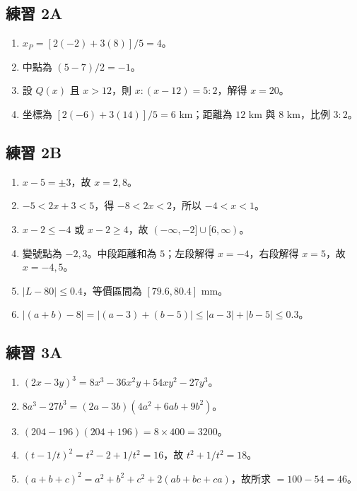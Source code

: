 \documentclass[11pt,a4paper]{article}
\providecommand{\tightlist}{%
  \setlength{\itemsep}{0pt}\setlength{\parskip}{0pt}}
\begin{document}
\subsection{練習 2A}\label{ux7df4ux7fd2-2a-1}

\begin{enumerate}
\def\labelenumi{\arabic{enumi}.}
\tightlist
\item
  \(x_P=[2(-2)+3(8)]/5=\boxed4\)。
\item
  中點為 \((5-7)/2=\boxed{-1}\)。
\item
  設 \(Q(x)\) 且 \(x>12\)，則 \(x:(x-12)=5:2\)，解得 \(x=\boxed{20}\)。
\item
  坐標為 \([2(-6)+3(14)]/5=\boxed6\) km；距離為 \(12\) km 與 \(8\) km，比例 \(3:2\)。
\end{enumerate}

\subsection{練習 2B}\label{ux7df4ux7fd2-2b-1}

\begin{enumerate}
\def\labelenumi{\arabic{enumi}.}
\tightlist
\item
  \(x-5=\pm3\)，故 \(\boxed{x=2,8}\)。
\item
  \(-5<2x+3<5\)，得 \(-8<2x<2\)，所以 \(\boxed{-4<x<1}\)。
\item
  \(x-2\le-4\) 或 \(x-2\ge4\)，故 \(\boxed{(-\infty,-2]\cup[6,\infty)}\)。
\item
  變號點為 \(-2,3\)。中段距離和為 \(5\)；左段解得 \(x=-4\)，右段解得 \(x=5\)，故 \(\boxed{x=-4,5}\)。
\item
  \(\boxed{|L-80|\le0.4}\)，等價區間為 \(\boxed{[79.6,80.4]}\) mm。
\item
  \(|(a+b)-8|=|(a-3)+(b-5)|\le|a-3|+|b-5|\le\boxed{0.3}\)。
\end{enumerate}

\subsection{練習 3A}\label{ux7df4ux7fd2-3a-1}

\begin{enumerate}
\def\labelenumi{\arabic{enumi}.}
\tightlist
\item
  \((2x-3y)^3=\boxed{8x^3-36x^2y+54xy^2-27y^3}\)。
\item
  \(8a^3-27b^3=\boxed{(2a-3b)(4a^2+6ab+9b^2)}\)。
\item
  \((204-196)(204+196)=8\times400=\boxed{3200}\)。
\item
  \((t-1/t)^2=t^2-2+1/t^2=16\)，故 \(t^2+1/t^2=\boxed{18}\)。
\item
  \((a+b+c)^2=a^2+b^2+c^2+2(ab+bc+ca)\)，故所求 \(=100-54=\boxed{46}\)。
\end{enumerate}
\end{document}
